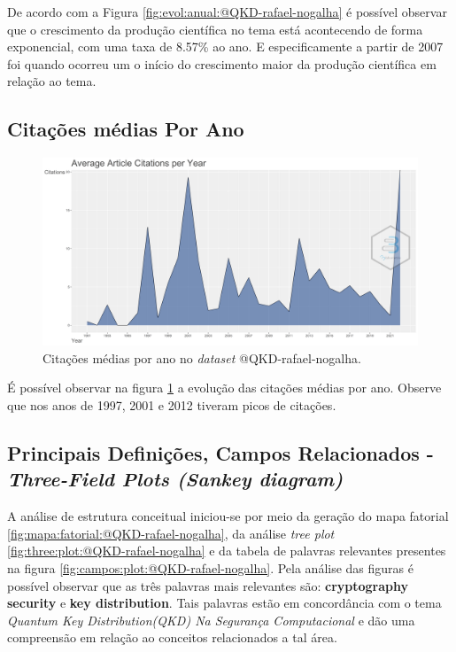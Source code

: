 De acordo com a Figura \ref{fig:evol:anual:@QKD-rafael-nogalha} é possível observar que o crescimento da produção científica no tema está acontecendo de forma exponencial, com uma taxa de 8.57\% ao ano. E especificamente a partir de 2007 foi quando ocorreu um o início do crescimento maior da produção científica em relação ao tema.

\subsection{Citações médias Por Ano}

\begin{figure}[H]
    \centering
    \includegraphics[width=1\textwidth]{experiments/rafaelnogalha/PesquisaBibliografica/QKDSegurancaComputacional/images/citacoes_media_por_ano.png}
    \caption{Citações médias por ano no \textit{dataset} @QKD-rafael-nogalha.}
    \label{fig:citacoes:anual:@QKD-rafael-nogalha}
\end{figure}

É possível observar na figura \ref{fig:citacoes:anual:@QKD-rafael-nogalha} a evolução das citações médias por ano. Observe que nos anos de 1997, 2001 e 2012 tiveram picos de citações.

\subsection{Principais Definições, Campos Relacionados - \textit{Three-Field Plots (Sankey diagram)}}

A análise de estrutura conceitual iniciou-se por meio da geração do mapa fatorial \ref{fig:mapa:fatorial:@QKD-rafael-nogalha}, da análise \textit{tree plot} \ref{fig:three:plot:@QKD-rafael-nogalha} e da tabela de palavras relevantes presentes na figura \ref{fig:campos:plot:@QKD-rafael-nogalha}. Pela análise das figuras é possível observar que as três palavras mais relevantes são: \textbf{cryptography} \textbf{security} e \textbf{key distribution}. Tais palavras estão em concordância com o tema \textit{Quantum Key Distribution(QKD) Na Segurança Computacional} e dão uma compreensão em relação ao conceitos relacionados a tal área.

